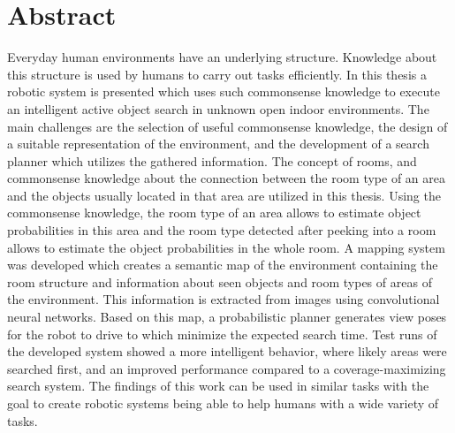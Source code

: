 

\chapter*{Abstract}
\label{cha:abstract}

Everyday human environments have an underlying structure. Knowledge about this structure is used by humans to carry out tasks efficiently. In this thesis a robotic system is presented which uses such commonsense knowledge to execute an intelligent active object search in unknown open indoor environments. The main challenges are the selection of useful commonsense knowledge, the design of a suitable representation of the environment, and the development of a search planner which utilizes the gathered information. The concept of rooms, and commonsense knowledge about the connection between the room type of an area and the objects usually located in that area are utilized in this thesis. Using the commonsense knowledge, the room type of an area allows to estimate object probabilities in this area and the room type detected after peeking into a room allows to estimate the object probabilities in the whole room. A mapping system was developed which creates a semantic map of the environment containing the room structure and information about seen objects and room types of areas of the environment. This information is extracted from images using convolutional neural networks. Based on this map, a probabilistic planner generates view poses for the robot to drive to which minimize the expected search time. Test runs of the developed system showed a more intelligent behavior, where likely areas were searched first, and an improved performance compared to a coverage-maximizing search system. The findings of this work can be used in similar tasks with the goal to create robotic systems being able to help humans with a wide variety of tasks.




